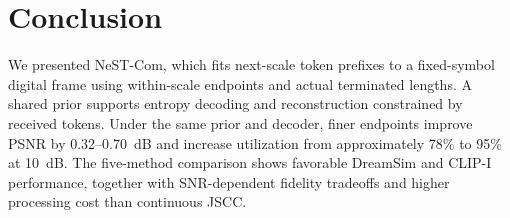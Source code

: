 \section{Conclusion}
We presented NeST-Com, which fits next-scale token prefixes to a fixed-symbol digital frame using within-scale endpoints and actual terminated lengths. A shared prior supports entropy decoding and reconstruction constrained by received tokens. Under the same prior and decoder, finer endpoints improve PSNR by 0.32--0.70~dB and increase utilization from approximately 78\% to 95\% at 10~dB. The five-method comparison shows favorable DreamSim and CLIP-I performance, together with SNR-dependent fidelity tradeoffs and higher processing cost than continuous JSCC.

